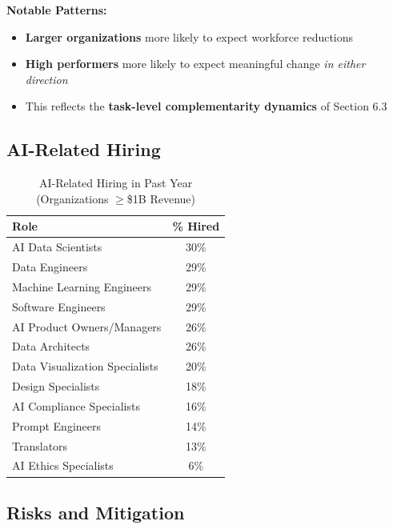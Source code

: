 \textbf{Notable Patterns:}
\begin{itemize}
\item \textbf{Larger organizations} more likely to expect workforce reductions
\item \textbf{High performers} more likely to expect meaningful change \textit{in either direction}
\item This reflects the \textbf{task-level complementarity dynamics} of Section 6.3
\end{itemize}


\subsection{AI-Related Hiring}

\begin{table}[htbp]
\centering
\caption{AI-Related Hiring in Past Year (Organizations $\geq$\$1B Revenue)}
\label{tab:vvv1-hiring}
\renewcommand{\arraystretch}{1.3}
\begin{tabular}{@{}lc@{}}
\toprule
\textbf{Role} & \textbf{\% Hired} \\
\midrule
AI Data Scientists & 30\% \\
Data Engineers & 29\% \\
Machine Learning Engineers & 29\% \\
Software Engineers & 29\% \\
AI Product Owners/Managers & 26\% \\
Data Architects & 26\% \\
Data Visualization Specialists & 20\% \\
Design Specialists & 18\% \\
AI Compliance Specialists & 16\% \\
Prompt Engineers & 14\% \\
Translators & 13\% \\
AI Ethics Specialists & 6\% \\
\bottomrule
\end{tabular}
\end{table}


\subsection{Risks and Mitigation}

